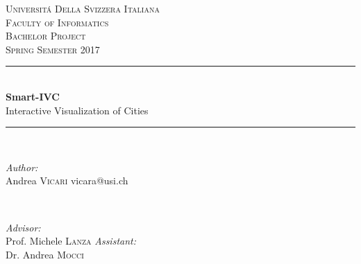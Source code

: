 \documentclass[11pt]{report}
\begin{document}
\begin{titlepage}

\newcommand{\HRule}{\rule{\linewidth}{0.5mm}} %

\center %
 
\textsc{\LARGE Universit\'a Della Svizzera Italiana}\\[1.5cm] %
\textsc{\Large Faculty of Informatics}\\[0.5cm] %
\textsc{\large Bachelor Project\\Spring Semester 2017}\\[0.5cm] %


\HRule \\[0.4cm]
{ \Huge \bfseries Smart-IVC}\\[0.4cm] %
{ \huge Interactive Visualization of Cities}
\HRule \\[1.5cm]
 

\begin{minipage}{0.4\textwidth}
\begin{flushleft} \large
\emph{Author:}\\
Andrea \textsc{Vicari} %
vicara@usi.ch %
\end{flushleft}
\end{minipage}
~
\begin{minipage}{0.4\textwidth}
\begin{flushright} \large
\emph{Advisor:} \\
Prof. Michele \textsc{Lanza} %
\emph{Assistant:} \\
Dr. Andrea \textsc{Mocci} %
\end{flushright}
\end{minipage}\\[4cm]


\end{titlepage}
\end{document}

